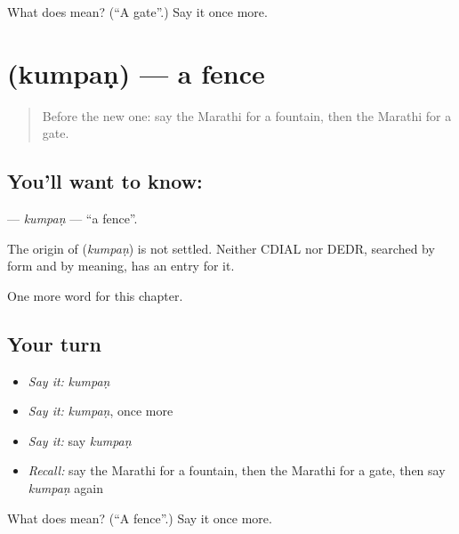\begin{tcolorbox}[breakable,colback=teal!4,colframe=teal!35!black,title={Before you move on}]
What does  mean? (\textquotedblleft{}A gate\textquotedblright{}.) Say it once more.
\end{tcolorbox}
\section[\texorpdfstring{\mr{कुंपण} (kumpaṇ)}{कुंपण (kumpaṇ)}]{ (kumpaṇ) — a fence}

\label{lesson:MR-C213-kumpan}



\begin{quote}
Before the new one: say the Marathi for a fountain, then the Marathi for a gate.
\end{quote}

\subsection*{You'll want to know: }
\textbf{} — \emph{kumpaṇ} — \textquotedblleft{}a fence\textquotedblright{}.

\begin{cousinweb}
The origin of \textbf{} (\emph{kumpaṇ}) is not settled. Neither CDIAL nor DEDR, searched by form and by meaning, has an entry for it.
\end{cousinweb}

\begin{grammarlens}[title={What you've built}]
One more word for this chapter.
\end{grammarlens}

\subsection*{Your turn}
\begin{itemize}
\raggedright
  \item \emph{Say it:} \emph{kumpaṇ}
  \item \emph{Say it:} \emph{kumpaṇ}, once more
  \item \emph{Say it:} say \emph{kumpaṇ}
  \item \emph{Recall:} say the Marathi for a fountain, then the Marathi for a gate, then say \emph{kumpaṇ} again
\end{itemize}

\begin{tcolorbox}[breakable,colback=teal!4,colframe=teal!35!black,title={Before you move on}]
What does  mean? (\textquotedblleft{}A fence\textquotedblright{}.) Say it once more.
\end{tcolorbox}
